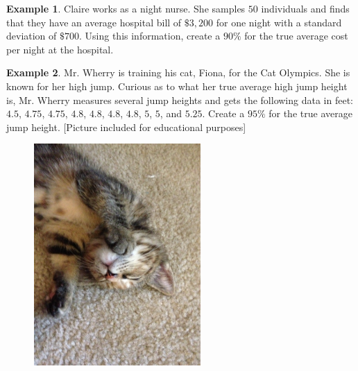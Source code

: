 \documentclass[12pt]{amsart}
\theoremstyle{definition}
\newtheorem{ex}{Example}
\begin{document}
\begin{ex}
	Claire works as a night nurse. She samples $50$ individuals and finds that they have an average hospital bill of $\$3,200$ for one night with a standard deviation of $\$700$. Using this information, create a $90\%$ for the true average cost per night at the hospital.
\end{ex}

\begin{ex}
	Mr. Wherry is training his cat, Fiona, for the Cat Olympics. She is known for her high jump. Curious as to what her true average high jump height is, Mr. Wherry measures several jump heights and gets the following data in feet: $4.5$, $4.75$, $4.75$, $4.8$, $4.8$, $4.8$, $4.8$, $5$, $5$, and $5.25$. Create a $95\%$ for the true average jump height. [Picture included for educational purposes]
\end{ex}

\begin{figure}[h]
 \centering
 \includegraphics[width=2.5in,keepaspectratio=true]{./IMG_0929.JPG}
 \label{fig: Fiona}
\end{figure}
\end{document}
